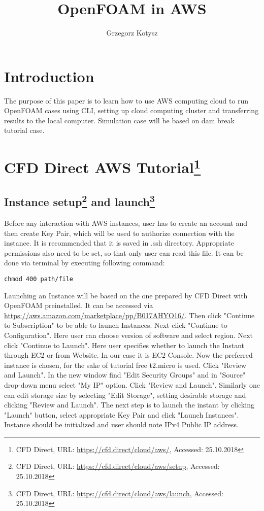\documentclass[11pt,english]{article}
\begin{document}
\thispagestyle{empty}
\title{OpenFOAM in AWS}

\author{Grzegorz Kotysz}

\date{}

\maketitle
\newpage{}

\tableofcontents{}

\newpage{}

\section{Introduction}

The purpose of this paper is to learn how to use AWS computing cloud to run OpenFOAM cases using CLI, setting up cloud computing cluster and transferring results to the local computer. Simulation case will be based on dam break tutorial case.

\section{CFD Direct AWS Tutorial\footnote{CFD Direct, URL: \url{https://cfd.direct/cloud/aws/}, Accessed: 25.10.2018}}

\subsection{Instance setup\footnote{CFD Direct, URL: \url{https://cfd.direct/cloud/aws/setup}, Accessed: 25.10.2018} and launch\footnote{CFD Direct, URL: \url{https://cfd.direct/cloud/aws/launch}, Accessed: 25.10.2018}}

Before any interaction with AWS instances, user has to create an account and then create Key Pair, which will be used to authorize connection with the instance. It is recommended that it is saved in .ssh directory. Appropriate permissions also need to be set, so that only user can read this file. It can be done via terminal by executing following command:
\begin{lstlisting}
chmod 400 path/file
\end{lstlisting}
Launching an Instance will be based on the one prepared by CFD Direct with OpenFOAM preinstalled. It can be accessed via \url{https://aws.amazon.com/marketplace/pp/B017AHYO16/}. Then click "Continue to Subscription" to be able to launch Instances. Next click "Continue to Configuration". Here user can choose version of software and select region. Next click "Continue to Launch".
Here user specifies whether to launch the Instant through EC2 or from Website. In our case it is EC2 Console. Now the preferred instance is chosen, for the sake of tutorial free t2.micro is used. Click "Review and Launch". In the new window find "Edit Security Groups" and in "Source" drop-down menu select "My IP" option. Click "Review and Launch". Similarly one can edit storage size by selecting "Edit Storage", setting desirable storage and clicking "Review and Launch".
The next step is to launch the instant by clicking "Launch" button, select appropriate Key Pair and click "Launch Instances". Instance should be initialized and user should note IPv4 Public IP address.
\end{document}
